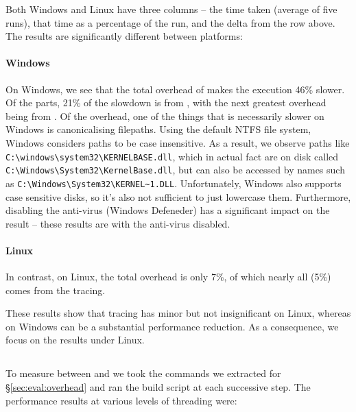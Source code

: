 Both Windows and Linux have three columns -- the time taken (average of five runs), that time as a percentage of the \Make run, and the delta from the row above. The results are significantly different between platforms:

\paragraph{Windows} On Windows, we see that the total overhead of \Rattle makes the execution 46\% slower. Of the parts, 21\% of the slowdown is from \Fsatrace, with the next greatest overhead being from \Rattle. Of the \Rattle overhead, one of the things that is necessarily slower on Windows is canonicalising filepaths. Using the default NTFS file system, Windows considers paths to be case insensitive. As a result, we observe paths like \verb"C:\windows\system32\KERNELBASE.dll", which in actual fact are on disk called \verb"C:\Windows\System32\KernelBase.dll", but can also be accessed by names such as \verb"C:\Windows\System32\KERNEL~1.DLL". Unfortunately, Windows also supports case sensitive disks, so it's also not sufficient to just lowercase them. Furthermore, disabling the anti-virus (Windows Defeneder) has a significant impact on the result -- these results are with the anti-virus disabled.

\paragraph{Linux} In contrast, on Linux, the total overhead is only 7\%, of which nearly all (5\%) comes from the tracing.

\postparagrahs

These results show that tracing has minor but not insignificant on Linux, whereas on Windows can be a substantial performance reduction. As a consequence, we focus on the results under Linux.

\subsection{\Fsatrace}
\label{sec:eval:fsatrace}

To measure \Fsatrace between \Make and \Rattle we took the commands we extracted for \S\ref{sec:eval:overhead} and ran the build script at each successive step. The performance results at various levels of threading were:

